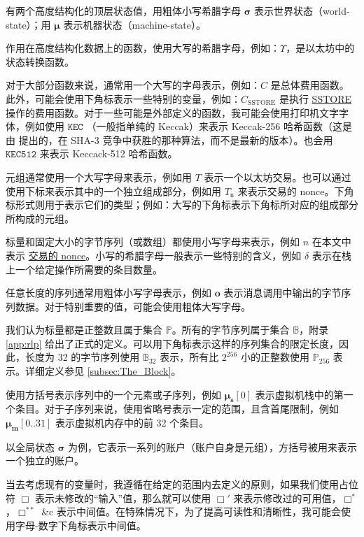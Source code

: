 \documentclass[9pt,oneside]{amsart}
\begin{document}
\begin{multicols}{2}
有两个高度结构化的顶层状态值，用粗体小写希腊字母 $\boldsymbol{\sigma}$ 表示世界状态（world-state）；用 $\boldsymbol{\mu}$ 表示机器状态（machine-state）。

作用在高度结构化数据上的函数，使用大写的希腊字母，例如：\hyperlink{Upsilon_state_transition}{$\Upsilon$}，是以太坊中的状态转换函数。

对于大部分函数来说，通常用一个大写的字母表示，例如：$C$ 是总体费用函数。此外，可能会使用下角标表示一些特别的变量，例如：\hyperlink{C__SSTORE}{$C_\text{SSTORE}$} 是执行 \hyperlink{SSTORE}{{\tiny SSTORE}} 操作的费用函数。对于一些可能是外部定义的函数，我可能会使用打印机文字字体，例如使用 $\texttt{KEC}$ （一般指单纯的 Keccak）来表示 Keccak-256 哈希函数（这是由 \cite{Keccak} 提出的，在 SHA-3 竞争中获胜的那种算法，而不是最新的版本）。也会用 $\texttt{KEC512}$ 来表示 Keccack-512 哈希函数。

元组通常使用一个大写字母来表示，例如用 $T$ 表示一个以太坊交易。也可以通过使用下标来表示其中的一个独立组成部分，例如用 \hyperlink{transaction_nonce}{$T_{\mathrm{n}}$} 来表示交易的 nonce。下角标形式则用于表示它们的类型；例如：大写的下角标表示下角标所对应的组成部分所构成的元组。

标量和固定大小的字节序列（或数组）都使用小写字母来表示，例如 $n$ 在本文中表示 \hyperlink{transaction_nonce}{交易的 nonce}。小写的希腊字母一般表示一些特别的含义，例如 $\delta$ 表示在栈上一个给定操作所需要的条目数量。

任意长度的序列通常用粗体小写字母表示，例如 $\mathbf{o}$ 表示消息调用中输出的字节序列数据。对于特别重要的值，可能会使用粗体大写字母。

我们认为标量都是正整数且属于集合 $\mathbb{P}$。所有的字节序列属于集合 $\mathbb{B}$，附录 \ref{app:rlp} 给出了正式的定义。可以用下角标表示这样的序列集合的限定长度，因此，长度为 32 的字节序列使用 $\mathbb{B}_{32}$ 表示，所有比 $2^{256}$ 小的正整数使用 $\mathbb{P}_{256}$ 表示。详细定义参见 \hyperlink{block}{\ref{subsec:The_Block}}。

使用方括号表示序列中的一个元素或子序列，例如 $\boldsymbol{\mu}_\mathbf{s}[0]$ 表示虚拟机栈中的第一个条目。对于子序列来说，使用省略号表示一定的范围，且含首尾限制，例如 $\boldsymbol{\mu}_\mathbf{m}[0..31]$ 表示虚拟机内存中的前 32 个条目。

以全局状态 $\boldsymbol{\sigma}$ 为例，它表示一系列的账户（账户自身是元组），方括号被用来表示一个独立的账户。

当去考虑现有的变量时，我遵循在给定的范围内去定义的原则，如果我们使用占位符 $\Box$ 表示未修改的“输入”值，那么就可以使用 $\Box'$ 来表示修改过的可用值，$\Box^*$，$\Box^{**}$ \&c 表示中间值。在特殊情况下，为了提高可读性和清晰性，我可能会使用字母-数字下角标表示中间值。


\end{multicols}
\end{document}
